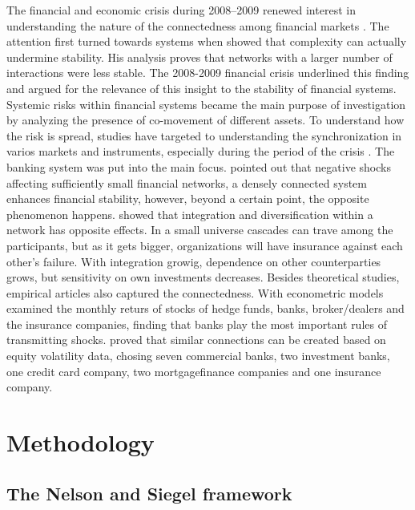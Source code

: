 \documentclass{article}
\begin{document}
The financial and economic crisis during 2008–2009 renewed interest in understanding the nature of the connectedness among financial markets \cite{aloui2011global}. The attention first turned towards systems when \cite{may1972will} showed that complexity can actually undermine stability. His analysis proves that networks with a larger number of interactions were less stable. The 2008-2009 financial crisis underlined this finding and \cite{haldane2011systemic} argued for the relevance of this insight to the stability of financial systems. Systemic risks within financial systems became the main purpose of investigation by analyzing the presence of co-movement of different assets. To understand how the risk is spread, studies have targeted to understanding the synchronization in varios markets and instruments, especially during the period of the crisis \cite{bisias2012survey}. The banking system was put into the main focus. \cite{acemoglu2015systemic} pointed out that negative shocks affecting sufficiently small financial networks, a densely connected system enhances financial stability, however, beyond a certain point, the opposite phenomenon happens.  \cite{elliott2014financial} showed that integration and diversification within a network has opposite effects. In a small universe cascades can trave among the participants, but as it gets bigger, organizations will have insurance against each other’s failure. With integration growig, dependence on other counterparties grows, but sensitivity on own investments decreases. Besides theoretical studies, empirical articles also captured the connectedness. With econometric models \cite{billio2012econometric} examined the monthly returs of stocks of hedge funds, banks, broker/dealers and the insurance companies, finding that banks play the most important rules of transmitting shocks. \cite{diebold2014network} proved that similar connections can be created based on equity volatility data, chosing seven commercial banks, two investment banks, one credit card company, two mortgagefinance companies and one insurance company.



\section{Methodology}
\noindent
\subsection{The Nelson and Siegel framework}
\end{document}
